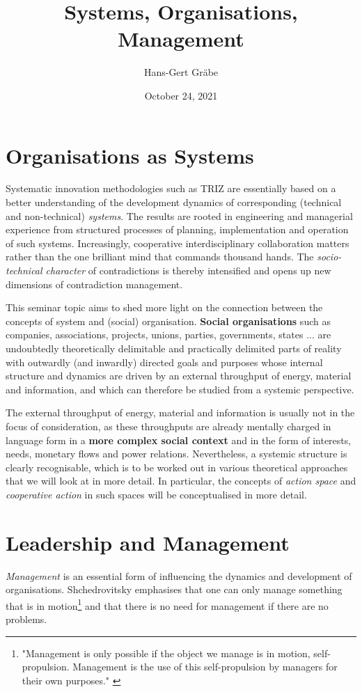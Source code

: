 \documentclass[11pt,a4paper]{article}
\title{Systems, Organisations, Management}
\author{Hans-Gert Gr\"abe}
\date{October 24, 2021}
\begin{document}
\maketitle

\section{Organisations as Systems}

Systematic innovation methodologies such as TRIZ are essentially based on a
better understanding of the development dynamics of corresponding (technical
and non-technical) \emph{systems}.  The results are rooted in engineering and
managerial experience from structured processes of planning, implementation
and operation of such systems. Increasingly, cooperative interdisciplinary
collaboration matters rather than the one brilliant mind that commands
thousand hands. The \emph{socio-technical character} of contradictions is
thereby intensified and opens up new dimensions of contradiction management.

This seminar topic aims to shed more light on the connection between the
concepts of system and (social) organisation. \textbf{Social organisations}
such as companies, associations, projects, unions, parties, governments,
states ... are undoubtedly theoretically delimitable and practically delimited
parts of reality with outwardly (and inwardly) directed goals and purposes
whose internal structure and dynamics are driven by an external throughput of
energy, material and information, and which can therefore be studied from a
systemic perspective.

The external throughput of energy, material and information is usually not in
the focus of consideration, as these throughputs are already mentally charged
in language form in a \textbf{more complex social context} and in the form of
interests, needs, monetary flows and power relations. Nevertheless, a systemic
structure is clearly recognisable, which is to be worked out in various
theoretical approaches that we will look at in more detail. In particular, the
concepts of \emph{action space} and \emph{cooperative action} in such spaces
will be conceptualised in more detail.

\section{Leadership and Management}

\emph{Management} is an essential form of influencing the dynamics and
development of organisations. Shchedrovitsky emphasises that one can only
manage something that is in motion\footnote{"Management is only possible if
  the object we manage is in motion, self-propulsion. Management is the use of
  this self-propulsion by managers for their own purposes." \cite[p. 28]{MSM}}
and that there is no need for management if there are no problems.
\end{document}
